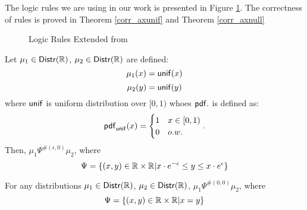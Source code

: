 \documentclass[a4paper,11pt]{article}
\begin{document}
The logic rules we are using in our work is presented in Figure \ref{logic_rule}. The correctness of rules is proved in Theorem \ref{corr_axunif} and Theorem \ref{corr_axnull}

\begin{figure}
\caption{Logic Rules Extended from \cite{barthe2016proving}}
\label{logic_rule}
\end{figure}


\begin{thm}
\label{corr_axunif}
Let $\mu_1 \in \mathsf{Distr}(\mathbb{R})$, $\mu_2 \in \mathsf{Distr}(\mathbb{R})$ are defined:
\[
	{\mu_1}(x) = \mathsf{unif}(x)
\]
\[
	{\mu_2}(y) = {\mathsf{unif}}(y)
\]
where $\mathsf{unif}$ is uniform distribution over $[0, 1)$ whoes $\mathsf{pdf}.$ is defined as:
\[
	\mathsf{pdf}_{\mathsf{unif}}(x) = 
	\begin{cases}
	1 & x \in [0, 1)\\
	0       & o.w.
	\end{cases}.
\]
Then, $\mu_1 \Psi^{\#(\epsilon, 0)} \mu_2$, where
\[
	\Psi = \{(x,y) \in \mathbb{R} \times \mathbb{R} | x \cdot e^{-\epsilon} \leq y \leq x \cdot e^{\epsilon} \}
\]
\end{thm}

\begin{thm}
\label{corr_axnull}
For any distributions $\mu_1 \in \mathsf{Distr}(\mathbb{R})$, $\mu_2 \in \mathsf{Distr}(\mathbb{R})$, $\mu_1 \Psi^{\#(0, 0)} \mu_2$, where
\[
	\Psi = \{(x,y) \in \mathbb{R} \times \mathbb{R} | x = y \}
\]
\end{thm}
\end{document}
